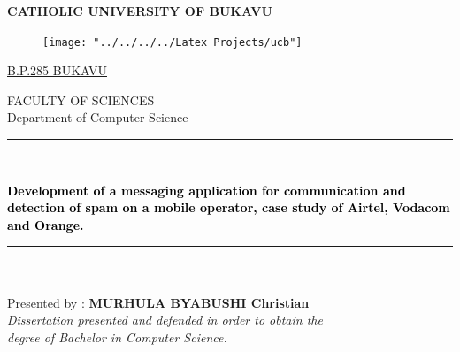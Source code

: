 \documentclass[12pt,a4paper]{report}
\begin{document}
 
	\begin{titlepage}
	\begin{center}
		\LARGE{{\textbf{CATHOLIC UNIVERSITY OF BUKAVU}}}\\
		\begin{center}
			\begin{figure}[h]
				\centering
					\texttt{[image: "../../../../Latex Projects/ucb"]}
			\end{figure}
			\large{\underline{B.P.285 BUKAVU}}
				\vspace{0.3cm}
		\end{center}
		\hspace*{0.5cm}
		{\large {\huge {\LARGE 	FACULTY OF SCIENCES  \textsf{}}}}\\ 
			{\Large \hspace*{0.7cm} Department of Computer Science}
			\vspace*{0.1cm}
			\setlength{\fboxsep}{4mm}
			\setlength{\fboxrule}{1mm}
			\vspace{0.5 cm}
			\rule{1\textwidth}{3pt}\\
			\vspace{0.18 cm}
			\begin{minipage}[c]{15cm}
				\begin{center}
					\LARGE{\textbf{\textcolor{black}{Development of a messaging application for communication and detection of spam on a mobile operator, case study of Airtel, Vodacom and Orange.}}}
				\end{center}
		\end{minipage}
	\end{center}
	\hspace{3pt}\rule{1\textwidth}{3pt}
	\vspace{0.1cm}
	\begin {minipage}{0.5 \textwidth }	
	\begin{flushright}
		{\large 
			\vspace {0.1cm} 
			\begin{tabbing}					
				\hspace*{1cm} \\
				\\
				\hspace*{2cm} Presented by : \textbf{MURHULA BYABUSHI Christian}  \\
				\hspace{2cm} \textit{Dissertation presented and defended in order to obtain the} \\
				\hspace{2cm} \textit{degree of Bachelor in Computer Science.}\\

\end{tabbing}}
\end{flushright}
\end{minipage}
\end{titlepage}
\end{document}
